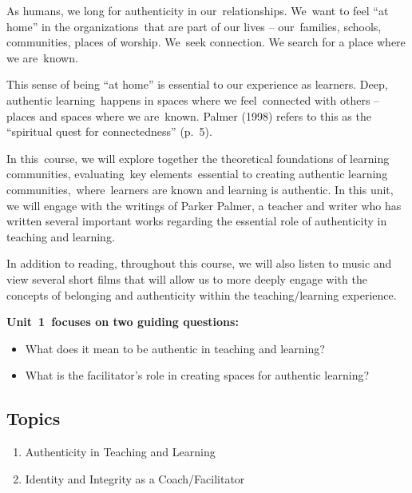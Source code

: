 \documentclass[
]{book}
\providecommand{\tightlist}{%
  \setlength{\itemsep}{0pt}\setlength{\parskip}{0pt}}
\begin{document}
As humans, we long for authenticity in our~relationships. We~want to feel ``at home'' in the organizations~that are part of our lives -- our~families, schools, communities, places of worship. We~seek connection. We search for a place where we are~known.

This sense of being ``at home'' is essential to our experience as learners. Deep, authentic learning~happens in spaces where we feel~connected with others -- places and spaces where we are~known. Palmer (1998) refers to this as the ``spiritual quest for connectedness'' (p.~5).

In this~course, we will explore together the theoretical foundations of learning communities, evaluating~key elements~essential to creating authentic learning communities,~where~learners are known and learning is authentic. In this unit, we will engage with the writings of Parker Palmer, a teacher and writer who has written several important works regarding the essential role of authenticity in teaching and learning.

In addition to reading, throughout this course, we will also listen to music and view several short films that will allow us to more deeply engage with the concepts of belonging and authenticity within the teaching/learning experience.

\textbf{Unit~1~focuses on two guiding questions:}

\begin{itemize}
\tightlist
\item
  What does it mean to be authentic in teaching and learning?\\
\item
  What is the facilitator's role in creating spaces for authentic learning?
\end{itemize}

\hypertarget{topics}{%
\subsection*{Topics}\label{topics}}

\begin{enumerate}
\def\labelenumi{\arabic{enumi}.}
\tightlist
\item
  Authenticity in Teaching and Learning\\
\item
  Identity and Integrity as a Coach/Facilitator
\end{enumerate}
\end{document}

